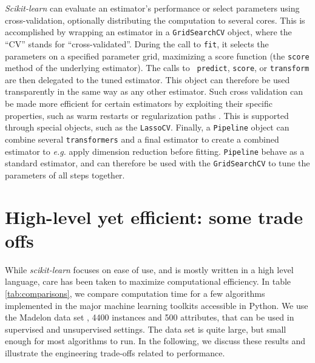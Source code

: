 \documentclass[twoside,11pt]{article}
\begin{document}
\smallskip {}
%
\emph{Scikit-learn} can evaluate an estimator's performance or select
parameters using cross-validation, optionally distributing the
computation to several cores.
This is accomplished by wrapping an estimator in a {\tt GridSearchCV}
object, where the ``CV'' stands for ``cross-validated''.
During the call to {\tt fit}, it selects the parameters
on a specified parameter grid, maximizing a score function
(the {\tt score} method of the underlying estimator). The calls to {\tt
predict}, {\tt score}, or {\tt transform} are then delegated to the tuned
estimator. This object can therefore be used transparently in the same
way as any other
estimator.
Such cross validation can be made more efficient for certain
estimators by exploiting their specific properties, such as warm restarts
or regularization paths \citep{friedman2010}. This is supported through special
objects, such as the {\tt LassoCV}.
%
Finally, a {\tt Pipeline} object can
combine several {\tt transformers} and a final estimator to create a
combined estimator to \emph{e.g.} apply dimension reduction before
fitting. {\tt Pipeline} behave as a standard estimator, and can
therefore be used
with the {\tt GridSearchCV} to tune the parameters of all steps together.

\section{High-level yet efficient: some trade offs}

While \emph{scikit-learn} focuses on ease of use, and is
mostly written in a high level language, care has been taken to maximize
computational efficiency. In table \ref{tab:comparisons}, we compare
computation time for a few algorithms implemented in the major machine
learning toolkits accessible in Python. We use the Madelon data
set \citep{Guyon2004}, 4400 instances and 500 attributes,
that can be used in supervised
and unsupervised settings.  The data set is quite large, but small enough for most
algorithms to run.
In the following, we discuss these results and illustrate
the engineering trade-offs related to performance.
\end{document}
